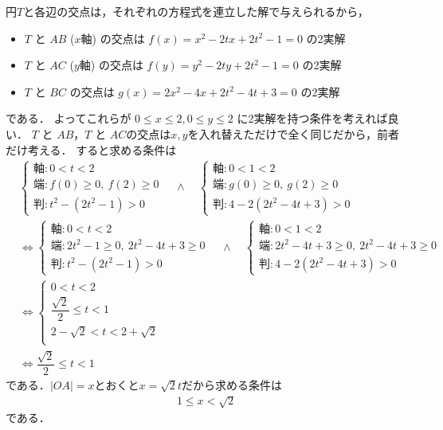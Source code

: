 \documentclass[../../main.tex]{subfiles}
\begin{document}
円$T$と各辺の交点は，それぞれの方程式を連立した解で与えられるから，
\begin{itemize}
  \item $T$ と $AB$ ($x$軸) の交点は $f(x)=x^2 - 2tx + 2t^2 - 1 = 0$ の2実解 \\
  \item $T$ と $AC$ ($y$軸) の交点は $f(y)=y^2 - 2ty + 2t^2 - 1 = 0$ の2実解 \\
  \item $T$ と $BC$ の交点は $g(x)=2x^2 - 4x + 2t^2 - 4t + 3 = 0$ の2実解
\end{itemize}
である．
よってこれらが $0 \le x \le 2, 0 \le y \le 2$ に2実解を持つ条件を考えれば良い．
$T$ と $AB$，$T$ と $AC$の交点は$x,y$を入れ替えただけで全く同じだから，前者だけ考える．
すると求める条件は
\begin{align}
  &
  \begin{cases}
    \text{軸}: 0 < t < 2 \\
    \text{端}: f(0) \ge 0, \ f(2) \ge 0 \\
    \text{判}: t^2 - (2t^2 - 1) > 0
  \end{cases}
  \quad \wedge \quad
  \begin{cases}
    \text{軸}: 0 < 1 < 2 \\
    \text{端}: g(0) \ge 0, \ g(2) \ge 0 \\
    \text{判}: 4 - 2(2t^2 - 4t + 3) > 0
  \end{cases}
  \\
  &\iff
  \begin{cases}
    \text{軸}: 0 < t < 2 \\
    \text{端}: 2t^2 - 1 \ge 0, \ 2t^2 - 4t + 3 \ge 0 \\
    \text{判}: t^2 - (2t^2 - 1) > 0
  \end{cases}
  \quad \wedge \quad
  \begin{cases}
    \text{軸}: 0 < 1 < 2 \\
    \text{端}: 2t^2 - 4t + 3 \ge 0, \ 2t^2 - 4t + 3 \ge 0 \\
    \text{判}: 4 - 2(2t^2 - 4t + 3) > 0
  \end{cases}
  \\
  &\iff
  \begin{cases}
    0 < t < 2 \\
    \dfrac{\sqrt{2}}{2} \le t < 1 \\
    2 - \sqrt{2} < t < 2 + \sqrt{2} \\
  \end{cases} \\
  &\iff \dfrac{\sqrt{2}}{2} \le t < 1
\end{align}
である．$|OA|=x$とおくと$x=\sqrt{2}t$だから求める条件は
\begin{align}
  1 \le x < \sqrt{2}
\end{align}
である．
\end{document}
